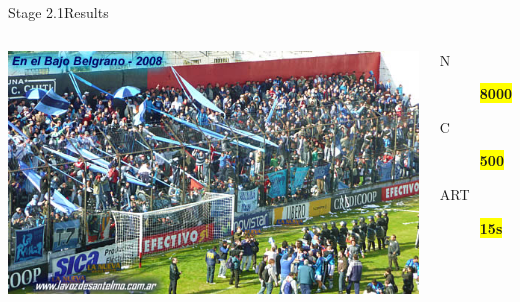 \documentclass[utf8,hyperref={colorlinks=true}]{beamer}
\begin{document}
\begin{frame}{Stage 2.1}{Results}
	\begin{columns}
			\includegraphics[top=-1,width=\textwidth]{img/results-3-1.jpg}
			\begin{description}
				\item[N] \textbf{\colorbox{yellow}{\Large 8000}}
				\item[C] \textbf{\colorbox{yellow}{\Large 500}}
				\item[ART] \textbf{\colorbox{yellow}{\color{red}\Large 15s}}
			\end{description}
	\end{columns}
\end{frame}
\end{document}
